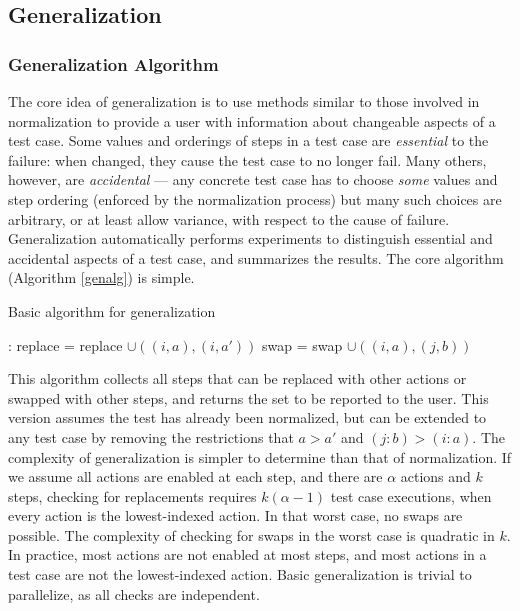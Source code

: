 \subsection{Generalization}

\subsubsection{Generalization Algorithm}

The core idea of generalization is to use methods similar to those
involved in normalization to provide a user with information about
changeable aspects of a test case.  Some values and orderings of steps
in a test case are \emph{essential} to the failure: when changed, they
cause the test case to no longer fail.  Many others, however, are
\emph{accidental} --- any concrete test case has to choose \emph{some}
values and step ordering (enforced by the normalization
process) but many such choices are arbitrary, or at least allow
variance, with respect to the cause of failure.  Generalization
automatically performs experiments to distinguish essential and accidental aspects
of a test case, and summarizes the results.  The core algorithm
(Algorithm \ref{genalg}) is simple.

\begin{algorithm}
\caption{Basic algorithm for generalization}
\label{genalg}
\begin{algorithmic}[1]
:
\State replace = replace $\cup ((i,a),(i,a'))$
\EndIf
\EndFor 
{}
\State swap = swap $\cup ((i,a),(j,b))$
\EndIf
\EndFor
\EndFor
{}
\end{algorithmic}
\end{algorithm}

This algorithm collects all steps that can be replaced with other
actions or swapped with other steps, and returns the set to be
reported to the user.  This version assumes the test has already been
normalized, but can be extended to any test case by removing the
restrictions that $a > a'$ and $(j : b) > (i : a)$.  The complexity of
generalization is simpler to determine than that of normalization.  If
we assume all actions are enabled at each step, and there are $\alpha$
actions and $k$ steps, checking for replacements requires $k (\alpha-1)$
test case executions, when every action is the lowest-indexed action.
In that worst case, no swaps are possible.  The complexity of checking
for swaps in the worst case is quadratic in $k$.  In practice, most
actions are not enabled at most steps, and most actions in a test case
are not the lowest-indexed action.  Basic generalization is trivial to
parallelize, as all checks are independent.



